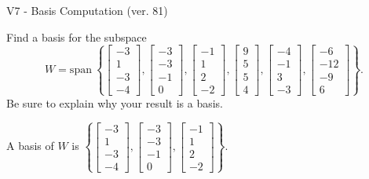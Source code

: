 \begin{exercise}
  \begin{exerciseTitle}V7 - Basis Computation (ver. 81)\end{exerciseTitle}
  \begin{exerciseStatement}
    Find a basis for the subspace 
\[W=\mathrm{span}\ \left\{\left[\begin{array}{r}
-3 \\
1 \\
-3 \\
-4
\end{array}\right] , \left[\begin{array}{r}
-3 \\
-3 \\
-1 \\
0
\end{array}\right] , \left[\begin{array}{r}
-1 \\
1 \\
2 \\
-2
\end{array}\right] , \left[\begin{array}{r}
9 \\
5 \\
5 \\
4
\end{array}\right] , \left[\begin{array}{r}
-4 \\
-1 \\
3 \\
-3
\end{array}\right] , \left[\begin{array}{r}
-6 \\
-12 \\
-9 \\
6
\end{array}\right]\right\}.\]
 Be sure to explain why your result is a basis.


  \end{exerciseStatement}
  \begin{exerciseAnswer}
   A basis of \(W\) is  \(\left\{\left[\begin{array}{r}
-3 \\
1 \\
-3 \\
-4
\end{array}\right] , \left[\begin{array}{r}
-3 \\
-3 \\
-1 \\
0
\end{array}\right] , \left[\begin{array}{r}
-1 \\
1 \\
2 \\
-2
\end{array}\right]\right\}\).
  


  \end{exerciseAnswer}
\end{exercise}